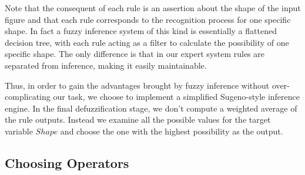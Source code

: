 Note that the consequent of each rule is an assertion about the shape of the input figure and that each rule corresponds to the recognition process for one specific shape. In fact a fuzzy inference system of this kind is essentially a flattened decision tree, with each rule acting as a filter to calculate the possibility of one specific shape. The only difference is that in our expert system rules are separated from inference, making it easily maintainable.

Thus, in order to gain the advantages brought by fuzzy inference without over-complicating our task, we choose to implement a simplified Sugeno-style inference engine. In the final defuzzification stage, we don't compute a weighted average of the rule outputs. Instead we examine all the possible values for the target variable $Shape$ and choose the one with the highest possibility as the output.

\subsection{Choosing Operators}